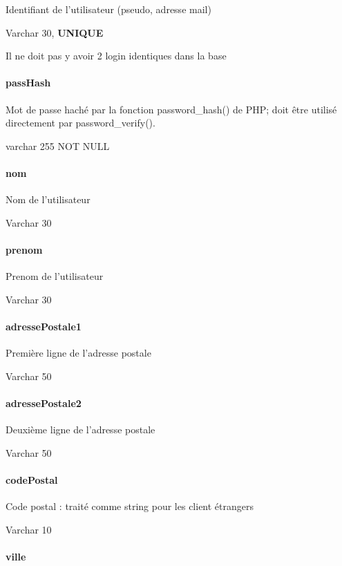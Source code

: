 Identifiant de l'utilisateur (pseudo, adresse mail)

Varchar 30, \textbf{UNIQUE}

Il ne doit pas y avoir 2 login identiques dans la base

\paragraph{passHash}\label{passhash}

Mot de passe haché par la fonction password\_hash() de PHP; doit être
utilisé directement par password\_verify().

varchar 255 NOT NULL

\paragraph{nom}\label{nom}

Nom de l'utilisateur

Varchar 30

\paragraph{prenom}\label{prenom}

Prenom de l'utilisateur

Varchar 30

\paragraph{adressePostale1}\label{adressepostale1}

Première ligne de l'adresse postale

Varchar 50

\paragraph{adressePostale2}\label{adressepostale2}

Deuxième ligne de l'adresse postale

Varchar 50

\paragraph{codePostal}\label{codepostal}

Code postal : traité comme string pour les client étrangers

Varchar 10

\paragraph{ville}\label{ville}

